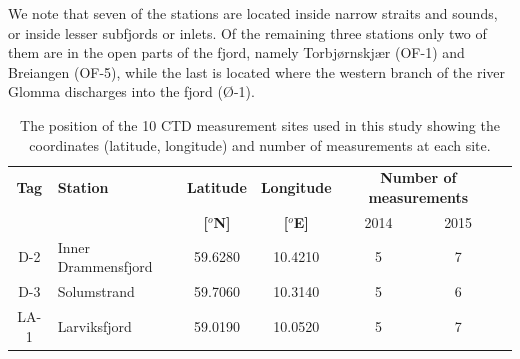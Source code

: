 We note that seven of the  stations are located inside narrow straits and sounds, or inside lesser subfjords or inlets. Of the remaining three stations only two of them are in the open parts of the fjord, namely Torbj{\o}rnskj{\ae}r (OF-1) and Breiangen (OF-5), while the last is located where the western branch of the river Glomma discharges into the fjord ({\O}-1).  

\begin{table}
\caption{The position of the 10 CTD measurement sites used in this study showing the coordinates (latitude, longitude) and number of measurements at each site.} 
\label{tab:CTD_pos} 
\centering 
\begin{tabular}{|clcccc@{}c|} 
\hline  
{\bf Tag} & {\bf Station} & {\bf Latitude} & {\bf Longitude} & \multicolumn{2}{c}{\bf Number of measurements} &\\ 
&& {\bf [$^o$N]} & {\bf [$^o$E]} & 2014 & 2015 &\\ \hline
D-2 & Inner Drammensfjord & 59.6280 & 10.4210 & 5 & 7 &\\ 
D-3 & Solumstrand & 59.7060 & 10.3140 & 5 & 6 &\\ \hline
LA-1 & Larviksfjord & 59.0190 & 10.0520 & 5 & 7 &\\ 

\end{tabular}
\end{table}
